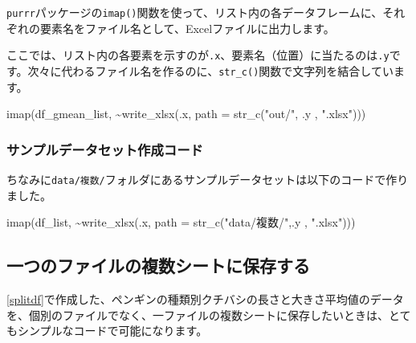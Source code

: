 \documentclass[
  xelatex,ja=standard, b5paper]{bxjsbook}
\newenvironment{Shaded}{\begin{snugshade}}{\end{snugshade}}
\newcommand{\AttributeTok}[1]{\textcolor[rgb]{0.77,0.63,0.00}{#1}}
\newcommand{\FunctionTok}[1]{\textcolor[rgb]{0.00,0.00,0.00}{#1}}
\newcommand{\NormalTok}[1]{#1}
\newcommand{\SpecialCharTok}[1]{\textcolor[rgb]{0.00,0.00,0.00}{#1}}
\newcommand{\StringTok}[1]{\textcolor[rgb]{0.31,0.60,0.02}{#1}}
\begin{document}
\texttt{purrr}パッケージの\texttt{imap()}関数を使って、リスト内の各データフレームに、それぞれの要素名をファイル名として、Excelファイルに出力します。

ここでは、リスト内の各要素を示すのが\texttt{.x}、要素名（位置）に当たるのは\texttt{.y}です。次々に代わるファイル名を作るのに、\texttt{str\_c()}関数で文字列を結合しています。

\begin{Shaded}
\begin{Highlighting}[]
\FunctionTok{imap}\NormalTok{(df\_gmean\_list, }\SpecialCharTok{\textasciitilde{}}\FunctionTok{write\_xlsx}\NormalTok{(.x, }\AttributeTok{path =} \FunctionTok{str\_c}\NormalTok{(}\StringTok{"out/"}\NormalTok{, .y , }\StringTok{".xlsx"}\NormalTok{)))}
\end{Highlighting}
\end{Shaded}

\hypertarget{ux30b5ux30f3ux30d7ux30ebux30c7ux30fcux30bfux30bbux30c3ux30c8ux4f5cux6210ux30b3ux30fcux30c9}{%
\subsubsection{サンプルデータセット作成コード}\label{ux30b5ux30f3ux30d7ux30ebux30c7ux30fcux30bfux30bbux30c3ux30c8ux4f5cux6210ux30b3ux30fcux30c9}}

ちなみに\texttt{data/複数/}フォルダにあるサンプルデータセットは以下のコードで作りました。

\begin{Shaded}
\begin{Highlighting}[]
\FunctionTok{imap}\NormalTok{(df\_list, }\SpecialCharTok{\textasciitilde{}}\FunctionTok{write\_xlsx}\NormalTok{(.x, }\AttributeTok{path =} \FunctionTok{str\_c}\NormalTok{(}\StringTok{"data/複数/"}\NormalTok{,.y , }\StringTok{".xlsx"}\NormalTok{)))}
\end{Highlighting}
\end{Shaded}

\hypertarget{ux4e00ux3064ux306eux30d5ux30a1ux30a4ux30ebux306eux8907ux6570ux30b7ux30fcux30c8ux306bux4fddux5b58ux3059ux308b}{%
\subsection{一つのファイルの複数シートに保存する}\label{ux4e00ux3064ux306eux30d5ux30a1ux30a4ux30ebux306eux8907ux6570ux30b7ux30fcux30c8ux306bux4fddux5b58ux3059ux308b}}

\ref{splitdf}で作成した、ペンギンの種類別クチバシの長さと大きさ平均値のデータを、個別のファイルでなく、一ファイルの複数シートに保存したいときは、とてもシンプルなコードで可能になります。
\end{document}
